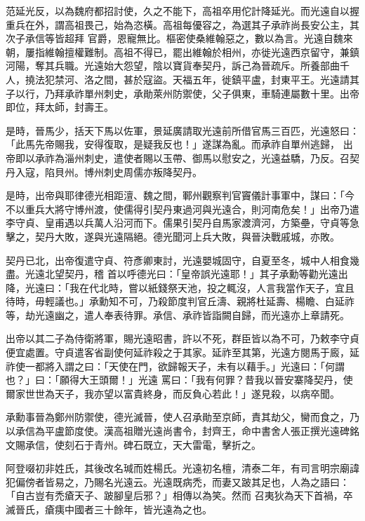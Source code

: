 \begin{pinyinscope}
 范延光反，以為魏府都招討使，久之不能下，高祖卒用佗計降延光。而光遠自以握重兵在外，謂高祖畏己，始為恣橫。高祖每優容之，為選其子承祚尚長安公主，其次子承信等皆超拜
 官爵，恩寵無比。樞密使桑維翰惡之，數以為言。光遠自魏來朝，屢指維翰擅權難制。高祖不得已，罷出維翰於相州，亦徙光遠西京留守，兼鎮河陽，奪其兵職。光遠始大怨望，陰以寶貨奉契丹，訴己為晉疏斥。所養部曲千人，撓法犯禁河、洛之間，甚於寇盜。天福五年，徙鎮平盧，封東平王。光遠請其子以行，乃拜承祚單州刺史，承勛萊州防禦使，父子俱東，車騎連屬數十里。出帝即位，拜太師，封壽王。



 是時，晉馬少，括天下馬以佐軍，景延廣請取光遠前所借官馬三百匹，光遠怒曰：「此馬先帝賜我，安得復取，是疑我反也！」遂謀為亂。而承祚自單州逃歸，
 出帝即以承祚為淄州刺史，遣使者賜以玉帶、御馬以慰安之，光遠益驕，乃反。召契丹入寇，陷貝州。博州刺史周儒亦叛降契丹。



 是時，出帝與耶律德光相距澶、魏之間，鄆州觀察判官竇儀計事軍中，謀曰：「今不以重兵大將守博州渡，使儒得引契丹東過河與光遠合，則河南危矣！」出帝乃遣李守貞、皇甫遇以兵萬人沿河而下。儒果引契丹自馬家渡濟河，方築壘，守貞等急擊之，契丹大敗，遂與光遠隔絕。德光聞河上兵大敗，與晉決戰戚城，亦敗。



 契丹已北，出帝復遣守貞、符彥卿東討，光遠嬰城固守，自夏至冬，城中人相食幾盡。光遠北望契丹，稽
 首以呼德光曰：「皇帝誤光遠耶！」其子承勳等勸光遠出降，光遠曰：「我在代北時，嘗以紙錢祭天池，投之輒沒，人言我當作天子，宜且待時，毋輕議也。」承勳知不可，乃殺節度判官丘濤、親將杜延壽、楊瞻、白延祚等，劫光遠幽之，遣人奉表待罪。承信、承祚皆詣闕自歸，而光遠亦上章請死。



 出帝以其二子為侍衛將軍，賜光遠昭書，許以不死，群臣皆以為不可，乃敕李守貞便宜處置。守貞遣客省副使何延祚殺之于其家。延祚至其第，光遠方閱馬于廄，延祚使一都將入謂之曰：「天使在門，欲歸報天子，未有以藉手。」光遠曰：「何謂也？」曰：「願得大王頭爾！」光遠
 罵曰：「我有何罪？昔我以晉安寨降契丹，使爾家世世為天子，我亦望以富貴終身，而反負心若此！」遂見殺，以病卒聞。



 承勳事晉為鄭州防禦使，德光滅晉，使人召承勛至京師，責其劫父，臠而食之，乃以承信為平盧節度使。漢高祖贈光遠尚書令，封齊王，命中書舍人張正撰光遠碑銘文賜承信，使刻石于青州。碑石既立，天大雷電，擊折之。



 阿登啜初非姓氏，其後改名瑊而姓楊氏。光遠初名檀，清泰二年，有司言明宗廟諱犯偏傍者皆易之，乃賜名光遠云。光遠既病禿，而妻又跛其足也，人為之語曰：「自古豈有禿瘡天子、跛腳皇后邪？」相傳以為笑。然而
 召夷狄為天下首禍，卒滅晉氏，瘡痍中國者三十餘年，皆光遠為之也。



\end{pinyinscope}